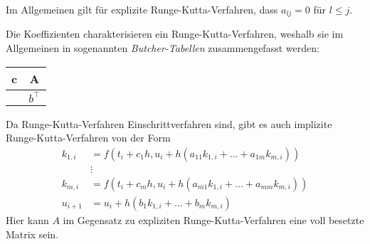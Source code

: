 Im Allgemeinen gilt für explizite Runge-Kutta-Verfahren, dass $a_{lj} = 0$ für $l \leq j$.\\
\begin{bem}
    Die Koeffizienten charakterisieren ein Runge-Kutta-Verfahren, weshalb sie im Allgemeinen in sogenannten
    \textit{Butcher-Tabellen} zusammengefasst werden:
    \begin{center}
        \begin{tabular}{c | c}
            c & A \\
            \hline
            & $b^{\intercal}$
        \end{tabular}
    \end{center}
\end{bem}
Da Runge-Kutta-Verfahren Einschrittverfahren sind, gibt es auch implizite Runge-Kutta-Verfahren von der Form
\begin{align*}
    k_{1,i} &= f(t_i+c_1h, u_i + h(a_{11}k_{1,i} + \dots + a_{1m} k_{m,i})) \\
    &\vdots\\
    k_{m,i} &= f(t_i+c_mh, u_i + h(a_{m1}k_{1,i} + \dots + a_{mm} k_{m,i}))\\
    u_{i+1} &= u_i + h(b_1 k_{1,i} + \dots + b_m k_{m,i})
\end{align*}
Hier kann $A$ im Gegensatz zu expliziten Runge-Kutta-Verfahren eine voll besetzte Matrix sein.

